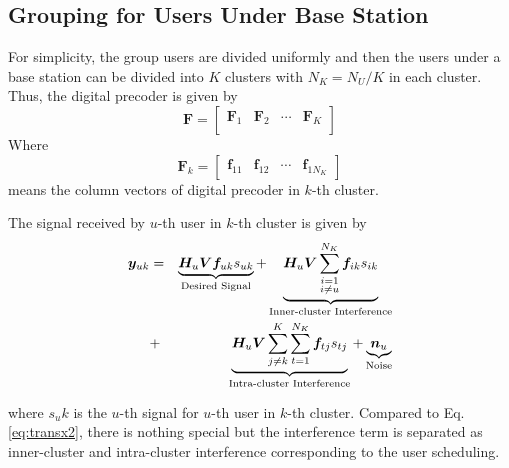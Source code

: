 \documentclass[conference]{IEEEtran}
\begin{document}
\subsection{Grouping for Users Under Base Station}
For simplicity, the group users are divided uniformly and then the users under a base station can be divided into $K$ clusters with $N_K = N_U/K$ in each cluster. Thus, the digital precoder is given by
\begin{equation}
\bm{F} = 
\begin{bmatrix}
\bm{F}_{1}&\bm{F}_{2}&\cdots&\bm{F}_{K}\\
\end{bmatrix}
\end{equation}
Where
\begin{equation}
\bm{F}_k =
\begin{bmatrix}
	\bm{f}_{11}&\bm{f}_{12}&\cdots&\bm{f}_{1N_K}
\end{bmatrix}
\end{equation}
means the column vectors of digital precoder in $k$-th cluster.

The signal received by $u$-th user in $k$-th cluster is given by 
\begin{eqnarray}{\label{eq:rewrite2}}
{\bm y}_{uk} &=&\underbrace{\bm{H}_u \bm{V}\bm{f}_{uk}{s}_{uk}}_\text{Desired Signal}+\underbrace{\bm{H}_u \bm{V}\sum_{\substack{i=1 \\ i\neq u}}^{N_K}\bm{f}_{ik}s_{ik}}_\text{Inner-cluster Interference} \nonumber\\
&+& \underbrace{\bm{H}_u \bm{V}\sum_{j\neq k}^K \sum_{t=1}^{N_K} \bm{f}_{tj}{s}_{tj}}_\text{Intra-cluster Interference}+ \underbrace{\bm{n}_u}_\text{Noise}
\end{eqnarray}

where $s_uk$ is the $u$-th signal for $u$-th user in $k$-th cluster. Compared to Eq. \eqref{eq:transx2}, there is nothing special but the interference term is separated as inner-cluster and intra-cluster interference corresponding to the user scheduling.
\end{document}
